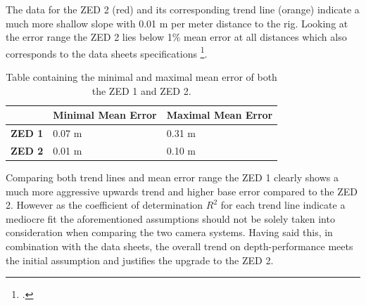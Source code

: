 The data for the ZED 2 (red) and its corresponding trend line (orange) indicate a much more shallow slope with 0.01 m per meter distance to the rig. Looking at the error range the ZED 2 lies below 1\% mean error at all distances which also corresponds to the data sheets specifications \footcite{zed2Datasheet}.



\begin{table}[h]
	\centering
	\begin{tabular}{|l|l|l|}
		\hline
		& \textbf{Minimal Mean Error} & \textbf{Maximal Mean Error} \\ \hline
		\textbf{ZED 1}  & 0.07 m 					  & 0.31 m                      \\ \hline
		\textbf{ZED 2} & 0.01 m                      & 0.10 m                      \\ \hline
	\end{tabular}
	\caption{Table containing the minimal and maximal mean error of both the ZED 1 and ZED 2.}
	\label{tab:errorMinimaMaxima}
\end{table}



Comparing both trend lines and mean error range the ZED 1 clearly shows a much more aggressive upwards trend and higher base error compared to the ZED 2. However as the coefficient of determination $R^{2}$ for each trend line indicate a mediocre fit the aforementioned assumptions should not be solely taken into consideration when comparing the two camera systems. 
Having said this, in combination with the data sheets, the overall trend on depth-performance meets the initial assumption and justifies the upgrade to the ZED 2.


\filbreak